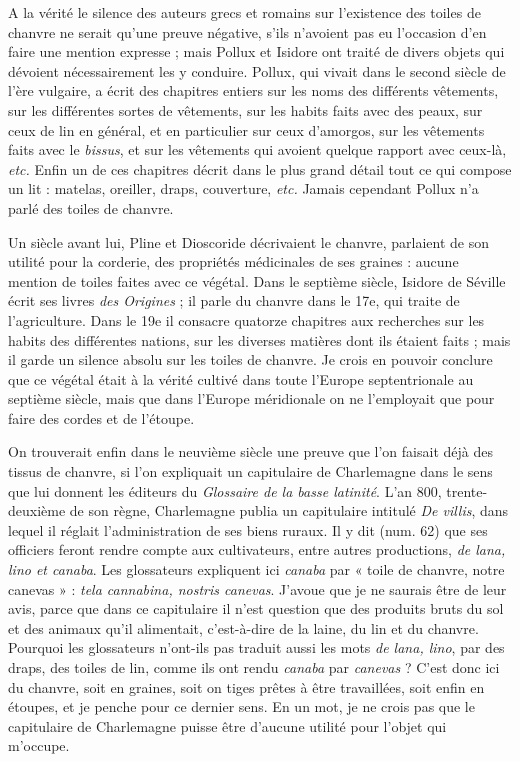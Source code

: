 \documentclass[a4paper, 11pt, oneside, polutonikogreek]{article}
\begin{document}
A la vérité le silence des auteurs grecs et romains sur l'existence des toiles de chanvre ne serait qu'une preuve négative, s'ils n'avoient pas eu l'occasion d'en faire une mention expresse ; mais Pollux et Isidore ont traité de divers objets qui dévoient nécessairement les y conduire. Pollux, qui vivait dans le second siècle de l'ère vulgaire, a écrit des chapitres entiers sur les noms des différents vêtements, sur les différentes sortes de vêtements, sur les habits faits avec des peaux, sur ceux de lin en général, et en particulier sur ceux d'amorgos, sur les vêtements faits avec le \emph{bissus}, et sur les vêtements qui avoient quelque rapport avec ceux-là, \emph{etc.} Enfin un de ces chapitres décrit dans le plus grand détail tout ce qui compose un lit : matelas, oreiller, draps, couverture, \emph{etc.} Jamais cependant Pollux n'a parlé des toiles de chanvre.

Un siècle avant lui, Pline et Dioscoride décrivaient le chanvre, parlaient de son utilité pour la corderie, des propriétés médicinales de ses graines : aucune mention de toiles faites avec ce végétal. Dans le septième siècle, Isidore de Séville écrit ses livres \emph{des Origines} ; il parle du chanvre dans le 17e, qui traite de l'agriculture. Dans le 19e il consacre quatorze chapitres aux recherches sur les habits des différentes nations, sur les diverses matières dont ils étaient faits ; mais il garde un silence absolu sur les toiles de chanvre. Je crois en pouvoir conclure que ce végétal était à la vérité cultivé dans toute l'Europe septentrionale au septième siècle, mais que dans l'Europe méridionale on ne l'employait que pour faire des cordes et de l'étoupe.

On trouverait enfin dans le neuvième siècle une preuve que l'on faisait déjà des tissus de chanvre, si l'on expliquait un capitulaire de Charlemagne dans le sens que lui donnent les éditeurs du \emph{Glossaire de la basse latinité}. L'an 800, trente-deuxième de son règne, Charlemagne publia un capitulaire intitulé \emph{De villis}, dans lequel il réglait l'administration de ses biens ruraux. Il y dit (num. 62) que ses officiers feront rendre compte aux cultivateurs, entre autres productions, \emph{de lana, lino et canaba}. Les glossateurs expliquent ici \emph{canaba} par « toile de chanvre, notre canevas » : \emph{tela cannabina, nostris canevas}. J'avoue que je ne saurais être de leur avis, parce que dans ce capitulaire il n'est question que des produits bruts du sol et des animaux qu'il alimentait, c'est-à-dire de la laine, du lin et du chanvre. Pourquoi les glossateurs n'ont-ils pas traduit aussi les mots \emph{de lana, lino}, par des draps, des toiles de lin, comme ils ont rendu \emph{canaba} par \emph{canevas} ? C'est donc ici du chanvre, soit en graines, soit on tiges prêtes à être travaillées, soit enfin en étoupes, et je penche pour ce dernier sens. En un mot, je ne crois pas que le capitulaire de Charlemagne puisse être d'aucune utilité pour l'objet qui m'occupe.
\end{document}
